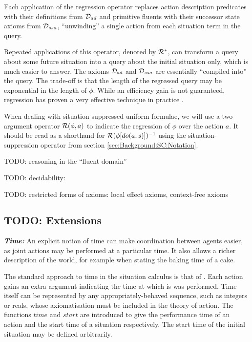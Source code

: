 Each application of the regression operator replaces action description
predicates with their definitions from $\mathcal{D}_{ad}$ and primitive fluents
with their successor state axioms from $\mathcal{D}_{ssa}$, {}``unwinding''
a single action from each situation term in the query.

Repeated applications of this operator, denoted by $\mathcal{R}^{*}$, can
transform a query about some future situation into a query about the
initial situation only, which is much easier to answer. The axioms
$\mathcal{D}_{ad}$ and $\mathcal{D}_{ssa}$ are essentially {}``compiled into''
the query. The trade-off is that the length of the regressed query
may be exponential in the length of $\phi$. While an efficiency gain
is not guaranteed, regression has proven a very effective technique
in practice \citep{levesque97golog,pirri99contributions_sitcalc}.

When dealing with situation-suppressed uniform formulae, we will use
a two-argument operator $\mathcal{R}(\phi,a)$ to indicate the regression
of $\phi$ over the action $a$. It should be read as a shorthand
for $\mathcal{R}(\phi[do(a,s)])^{-1}$ using the situation-suppression operator
from section \ref{sec:Background:SC:Notation}.

TODO: reasoning in the {}``fluent domain''

TODO: decidability: \citep{giacomo99impl_robots} \citep{levesque04krr_book}
\citep{yu07twovar_sitcalc}

TODO: restricted forms of axioms: local effect axioms, context-free
axioms


\subsection{TODO: Extensions}

\textbf{\emph{Time:}} An explicit notion of time can make coordination
between agents easier, as joint actions may be performed at a particular
time. It also allows a richer description of the world, for example
when stating the baking time of a cake.

The standard approach to time in the situation calculus is that of
\citep{reiter96sc_nat_conc,pinto94temporal}. Each action gains an
extra argument indicating the time at which is was performed. Time
itself can be represented by any appropriately-behaved sequence, such
as integers or reals, whose axiomatisation must be included in the
theory of action. The functions $time$ and $start$ are introduced
to give the performance time of an action and the start time of a
situation respectively. The start time of the initial situation may
be defined arbitrarily.

